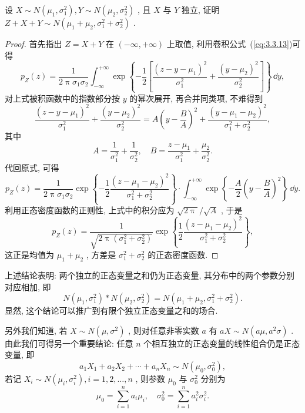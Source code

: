    \begin{example}[(正态分布的可加性)]\label{exam:3.3.6}
   	设 $X\sim N(\mu_1,\sigma_1^2),Y\sim N(\mu_2,\sigma_2^2)$ , 且 $X$ 与 $Y$ 独立, 证明 $Z+X+Y\sim N(\mu_1+\mu_2,\sigma_1^2+\sigma_2^2)$ .
   	\begin{proof}
   		首先指出 $Z=X+Y$ 在 $(-\infty,+\infty)$ 上取值, 利用卷积公式~(\ref{eq:3.3.13})可得
   		\begin{equation*}
   			p_Z(z)=\frac{1}{2\uppi\sigma_1\sigma_2}\int_{-\infty}^{+\infty}\exp\left\{-\frac{1}{2}\left[\frac{(z-y-\mu_1)^2}{\sigma_1^2}+\frac{(y-\mu_2)^2}{\sigma_2^2}\right]\right\}\,\dd y,
   		\end{equation*}
   		对上式被积函数中的指数部分按 $y$ 的幂次展开, 再合并同类项, 不难得到
   		\begin{equation*}
   			\frac{(z-y-\mu_1)^2}{\sigma_1^2}+\frac{(y-\mu_2)^2}{\sigma_2^2}=A\left(y-\frac{B}{A}\right)^2+\frac{(y-\mu_1-\mu_2)^2}{\sigma_1^2+\sigma_2^2},
   		\end{equation*}
   		其中
   		\begin{equation*}
   			A=\frac{1}{\sigma_1^2}+\frac{1}{\sigma_2^2},\quad B=\frac{z-\mu_1}{\sigma_1^2}+\frac{\mu_2}{\sigma_2^2}.
   		\end{equation*}
   		代回原式, 可得
   		\begin{equation*}
   			p_Z(z)=\frac{1}{2\uppi\sigma_1\sigma_2}\exp\left\{-\frac{1}{2}\frac{(z-\mu_1-\mu_2)^2}{\sigma_1^2+\sigma_2^2}\right\}\cdot\int_{-\infty}^{+\infty}\exp\left\{-\frac{A}{2}\left(y-\frac{B}{A}\right)^2\right\}\,\dd y.
   		\end{equation*}
   		利用正态密度函数的正则性, 上式中的积分应为 $\sqrt{2\uppi}/\sqrt{A}$ , 于是
   		\begin{equation*}
   			p_Z(z)=\frac{1}{\sqrt{2\uppi(\sigma_1^2+\sigma_2^2)}}\exp\left\{\frac{1}{2}\frac{(z-\mu_1-\mu_2)^2}{\sigma_1^2+\sigma_2^2}\right\},
   		\end{equation*}
   		这正是均值为 $\mu_1+\mu_2$ , 方差是 $\sigma_1^2+\sigma_2^2$ 的正态密度函数.
   	\end{proof}
   \end{example}
   上述结论表明: 两个独立的正态变量之和仍为正态变量, 其分布中的两个参数分别对应相加, 即
   \begin{equation}\label{eq:3.3.14}
   	N(\mu_1,\sigma_1^2)\ast N(\mu_2,\sigma_2^2)=N(\mu_1+\mu_2,\sigma_1^2+\sigma_2^2).
   \end{equation}
   显然, 这个结论可以推广到有限个独立正态变量之和的场合.

   另外我们知道, 若 $X\sim N(\mu,\sigma^2)$ , 则对任意非零实数 $a$ 有 $aX\sim N(a\mu,a^2\sigma)$ . 由此我们可得另一个重要结论: 任意 $n$ 个相互独立的正态变量的线性组合仍是正态变量, 即
   \begin{equation}\label{eq:3.3.15}
   	a_1X_1+a_2X_2+\cdots+a_nX_n\sim N(\mu_0,\sigma_0^2),
   \end{equation}
   若记 $X_i\sim N(\mu_i,\sigma_i^2),i=1,2,\ldots,n$ , 则参数 $\mu_0$ 与 $\sigma_0^2$ 分别为
   \begin{equation*}
   	\mu_0=\sum_{i=1}^{n}a_i\mu_i,\quad \sigma_0^2=\sum_{i=1}^{n}a_i^2\sigma_i^2.
   \end{equation*}

